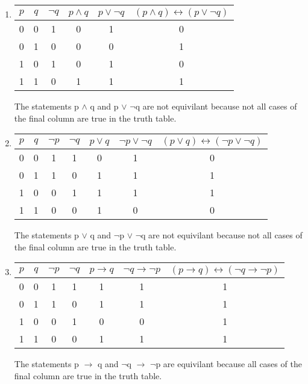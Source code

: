 \documentclass[11pt]{article}
\begin{document}
\begin{enumerate}
\item 
\begin{tabular}{|c|c|c|c|c|c|}
\hline
$p$ & $q$ & $\lnot q$ & $p \land q$ & $p \lor  \lnot q$ & $(p \land q) \leftrightarrow  (p \lor \lnot q)$ \\
\hline
0 & 0 & 1 & 0 & 1 & 0\\
0 & 1 & 0 & 0 & 0 & 1\\
1 & 0 & 1 & 0 & 1 & 0\\
1 & 1 & 0 & 1 & 1 & 1\\
\hline
\end{tabular}
\newline
The statements p $\wedge$ q and p $\lor$ $\neg$q are not equivilant because not all cases of the final column are true in the truth table.

\item
\begin{tabular}{|c|c|c|c|c|c|c|}
\hline
$p$ & $q$ & $\lnot p$ & $\lnot q$ & $p \lor q$ & $\lnot p \lor  \lnot q$ & $(p \lor q) \leftrightarrow  (\lnot p \lor \lnot q)$ \\
\hline
0 & 0 & 1 & 1 & 0 & 1 & 0\\
0 & 1 & 1 & 0 & 1 & 1 & 1\\
1 & 0 & 0 & 1 & 1 & 1 & 1\\
1 & 1 & 0 & 0 & 1 & 0 & 0\\
\hline
\end{tabular}
\newline
The statements p $\lor$ q and $\neg$p $\lor$ $\neg$q are not equivilant because not all cases of the final column are true in the truth table.

\item
\begin{tabular}{|c|c|c|c|c|c|c|}
\hline
$p$ & $q$ & $\lnot p$ & $\lnot q$ & $p \rightarrow q$ & $\lnot q \rightarrow  \lnot p$ & $(p \rightarrow q) \leftrightarrow  (\lnot q \rightarrow \lnot p)$ \\
\hline
0 & 0 & 1 & 1 & 1 & 1 & 1\\
0 & 1 & 1 & 0 & 1 & 1 & 1\\
1 & 0 & 0 & 1 & 0 & 0 & 1\\
1 & 1 & 0 & 0 & 1 & 1 & 1\\
\hline
\end{tabular}
\newline
The statements p $\rightarrow$ q and $\neg$q $\rightarrow$ $\neg$p are equivilant because all cases of the final column are true in the truth table.


\end{enumerate}
\end{document}
